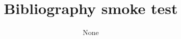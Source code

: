 \documentclass[manuscript,screen,review]{acmart}
\begin{document}
\title{Bibliography smoke test}
\author{None}
\maketitle
\nocite{*}


\end{document}

